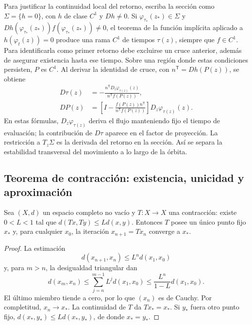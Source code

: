Para justificar la continuidad local del retorno, escriba la sección como
$\Sigma=\{h=0\}$, con $h$ de clase $C^1$ y $Dh\ne0$.
Si $\varphi_{\tau_*}(z_*)\in\Sigma$ y
$Dh(\varphi_{\tau_*}(z_*))f(\varphi_{\tau_*}(z_*))\ne0$, el teorema
de la función implícita aplicado a
$h(\varphi_t(z))=0$ produce una rama $C^1$ de tiempos $\tau(z)$,
siempre que $f\in C^1$. Para identificarla como primer retorno debe
excluirse un cruce anterior, además de asegurar existencia hasta ese tiempo.
Sobre una región donde estas condiciones persisten, $P$ es $C^1$.
Al derivar la identidad de cruce, con $n^{\mathsf T}=Dh(P(z))$, se obtiene
\begin{align}
 D\tau(z)&=-\frac{n^{\mathsf T}D_z\varphi_{\tau(z)}(z)}
                   {n^{\mathsf T}f(P(z))},\nonumber\\
 DP(z)&=\left[I-\frac{f(P(z))n^{\mathsf T}}
                        {n^{\mathsf T}f(P(z))}\right]
                        D_z\varphi_{\tau(z)}(z).
 \label{eq:guide-return-derivative}
\end{align}
En estas fórmulas, $D_z\varphi_{\tau(z)}$ deriva el flujo manteniendo
fijo el tiempo de evaluación; la contribución de $D\tau$ aparece en
el factor de proyección. La restricción a $T_z\Sigma$ es la derivada
del retorno en la sección. Así se separa la estabilidad transversal
del movimiento a lo largo de la órbita.

\subsection{Teorema de contracción: existencia, unicidad y aproximación}

\begin{proposition}
Sea $(X,d)$ un espacio completo no vacío y $T:X\to X$ una contracción: existe $0<L<1$ tal que
$d(Tx,Ty)\leq Ld(x,y)$. Entonces $T$ posee un único punto fijo $x_*$ y, para
cualquier $x_0$, la iteración $x_{n+1}=Tx_n$ converge a $x_*$.
\end{proposition}

\begin{proof}
La estimación
\[
 d(x_{n+1},x_n)\leq L^n d(x_1,x_0)
\]
y, para \(m>n\), la desigualdad triangular dan
\[
 d(x_m,x_n)\le\sum_{j=n}^{m-1}L^j d(x_1,x_0)
 \le\frac{L^n}{1-L}d(x_1,x_0).
\]
El último miembro tiende a cero, por lo que $(x_n)$ es de Cauchy. Por
completitud, $x_n\to x_*$. La continuidad de $T$ da $Tx_*=x_*$. Si $y_*$ fuera
otro punto fijo,
$d(x_*,y_*)\leq Ld(x_*,y_*)$, de donde $x_*=y_*$.
\end{proof}

